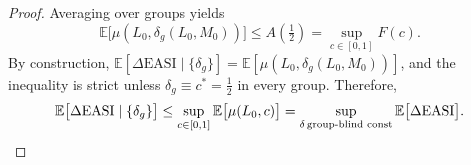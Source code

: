 \begin{proof}
Averaging over groups yields
\[
\mathbb E\big[\mu(L_0,\delta_g(L_0,M_0))\big]\le A(\tfrac12)=\sup_{c\in[0,1]} F(c).
\]
By construction, $\mathbb E[\Delta\mathrm{EASI}\mid\{\delta_g\}] = \mathbb E[\mu(L_0,\delta_g(L_0,M_0))]$, and the inequality is strict unless $\delta_g\equiv c^*=\tfrac12$ in every group. Therefore,
\[
\mathbb E\big[\Delta\mathrm{EASI}\mid\{\delta_g\}\big] \le \sup_{c\in[0,1]} \mathbb E\big[\mu(L_0,c)\big] 
= \sup_{\delta\,\text{group-blind const}} \mathbb E\big[\Delta\mathrm{EASI}\big].\qedhere
\]
\end{proof}
